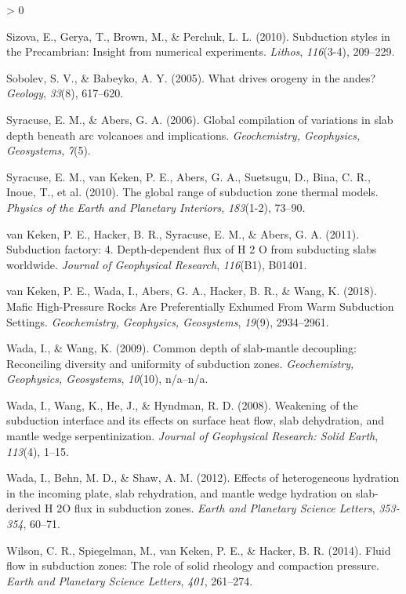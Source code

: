 \documentclass[draft,linenumbers]{agujournal2018}
\newlength{\cslhangindent}
\newenvironment{CSLReferences}[2] %
 {%
  \setlength{\parindent}{0pt}
  \ifodd #1 \everypar{\setlength{\hangindent}{\cslhangindent}}\ignorespaces\fi
  \ifnum #2 > 0
  \setlength{\parskip}{#2\baselineskip}
  \fi
 }%
 {}
\begin{document}
\begin{CSLReferences}{1}{0}
\leavevmode{}%
Sizova, E., Gerya, T., Brown, M., \& Perchuk, L. L. (2010). {Subduction
styles in the Precambrian: Insight from numerical experiments}.
\emph{Lithos}, \emph{116}(3-4), 209--229.

\leavevmode{}%
Sobolev, S. V., \& Babeyko, A. Y. (2005). What drives orogeny in the
andes? \emph{Geology}, \emph{33}(8), 617--620.

\leavevmode{}%
Syracuse, E. M., \& Abers, G. A. (2006). {Global compilation of
variations in slab depth beneath arc volcanoes and implications}.
\emph{Geochemistry, Geophysics, Geosystems}, \emph{7}(5).

\leavevmode{}%
Syracuse, E. M., van Keken, P. E., Abers, G. A., Suetsugu, D., Bina, C.
R., Inoue, T., et al. (2010). {The global range of subduction zone
thermal models}. \emph{Physics of the Earth and Planetary Interiors},
\emph{183}(1-2), 73--90.

\leavevmode{}%
van Keken, P. E., Hacker, B. R., Syracuse, E. M., \& Abers, G. A.
(2011). {Subduction factory: 4. Depth-dependent flux of H 2 O from
subducting slabs worldwide}. \emph{Journal of Geophysical Research},
\emph{116}(B1), B01401.

\leavevmode{}%
van Keken, P. E., Wada, I., Abers, G. A., Hacker, B. R., \& Wang, K.
(2018). {Mafic High-Pressure Rocks Are Preferentially Exhumed From Warm
Subduction Settings}. \emph{Geochemistry, Geophysics, Geosystems},
\emph{19}(9), 2934--2961.

\leavevmode{}%
Wada, I., \& Wang, K. (2009). {Common depth of slab-mantle decoupling:
Reconciling diversity and uniformity of subduction zones}.
\emph{Geochemistry, Geophysics, Geosystems}, \emph{10}(10), n/a--n/a.

\leavevmode{}%
Wada, I., Wang, K., He, J., \& Hyndman, R. D. (2008). {Weakening of the
subduction interface and its effects on surface heat flow, slab
dehydration, and mantle wedge serpentinization}. \emph{Journal of
Geophysical Research: Solid Earth}, \emph{113}(4), 1--15.

\leavevmode{}%
Wada, I., Behn, M. D., \& Shaw, A. M. (2012). {Effects of heterogeneous
hydration in the incoming plate, slab rehydration, and mantle wedge
hydration on slab-derived H 2O flux in subduction zones}. \emph{Earth
and Planetary Science Letters}, \emph{353-354}, 60--71.

\leavevmode{}%
Wilson, C. R., Spiegelman, M., van Keken, P. E., \& Hacker, B. R.
(2014). {Fluid flow in subduction zones: The role of solid rheology and
compaction pressure}. \emph{Earth and Planetary Science Letters},
\emph{401}, 261--274.

\end{CSLReferences}


\end{document}
